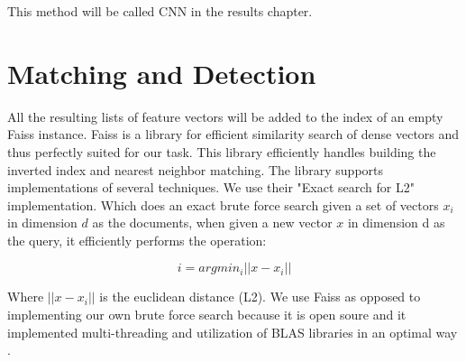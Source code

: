 \documentclass{report}
\begin{document}
This method will be called CNN in the results chapter.


\section{Matching and Detection}

All the resulting lists of feature vectors will be added to the index of an empty Faiss instance. Faiss is a library for efficient similarity search of dense vectors \cite{faiss, faiss-github} and thus perfectly suited for our task. This library efficiently handles building the inverted index and nearest neighbor matching. The library supports implementations of several techniques. We use their "Exact search for L2" implementation. Which does an exact brute force search given a set of vectors $x_i$ in dimension $d$ as the documents, when given a new vector $x$ in dimension d as the query, it efficiently performs the operation:

\[i = argmin_i||x - x_i||\]

\noindent Where $||x - x_i||$ is the euclidean distance (L2). We use Faiss as opposed to implementing our own brute force search because it is open soure and it implemented multi-threading and utilization of BLAS libraries in an optimal way \cite{faiss-blog}.
\\
\end{document}
